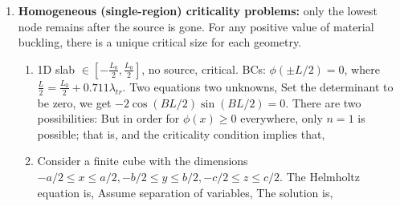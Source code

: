 \documentclass{school-22.211-notes}
\begin{document}
\clearpage
{}
\begin{enumerate}
\item \textbf{Homogeneous (single-region) criticality problems:}
 only the lowest node remains after the source is gone. For any positive value of material buckling, there is a unique critical size for each geometry. 
  \begin{enumerate}
  \item 1D slab $\in  \left[- \frac{L_0}{2}, \frac{L_0}{2} \right]$, no source, critical. 
    BCs: $\phi(\pm L/2) = 0$, where $\frac{L}{2} = \frac{L_0}{2} + 0.711 \lambda_{tr}$. Two equations two unknowns, 
    Set the determinant to be zero, we get $-2 \cos (BL/2) \sin (BL/2) = 0$. There are two possibilities: 
    But in order for $\phi(x) \ge 0$ everywhere, only $n=1$ is possible; that is, 
    and the criticality condition implies that, 

  \item Consider a finite cube with the dimensions $-a/2 \le x \le a/2, -b/2 \le y \le b/2, -c/2 \le z \le c/2$. The Helmholtz equation is,
    Assume separation of variables,
    The solution is, 



\end{enumerate}
\end{enumerate}
\end{document}
